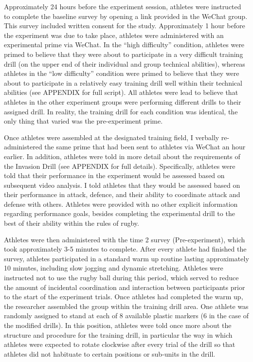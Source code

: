 Approximately 24 hours before the experiment session, athletes were instructed to complete the baseline survey by opening a link provided in the WeChat group.  This survey included written consent for the study. Approximately 1 hour before the experiment was due to take place, athletes were administered with an experimental prime via WeChat.  In the ``high difficulty'' condition, athletes were primed to believe that they were about to participate in a very difficult training drill (on the upper end of their individual and group technical abilities), whereas athletes in the ``low difficulty'' condition were primed to believe that they were about to participate in a relatively easy training drill well within their technical abilities (see APPENDIX for full script). All athletes were lead to believe that athletes in the other experiment groups were performing different drills to their assigned drill. In reality, the training drill for each condition was identical, the only thing that varied was the pre-experiment prime.

Once athletes were assembled at the designated training field, I verbally re-administered the same prime that had been sent to athletes via WeChat an hour earlier.  In addition, athletes were told in more detail about the requirements of the Invasion Drill (see APPENDIX for full details).  Specifically, athletes were told that their performance in the experiment would be assessed based on subsequent video analysis.  I told athletes that they would be assessed based on their performance in attack, defence, and their ability to coordinate attack and defense with others.  Athletes were provided with no other explicit information regarding performance goals, besides completing the experimental drill to the best of their ability within the rules of rugby.

Athletes were then administered with the time 2 survey (Pre-experiment), which took approximately 3-5 minutes to complete.  After every athlete had finished the survey, athletes participated in a standard warm up routine lasting approximately 10 minutes, including slow jogging and dynamic stretching.  Athletes were instructed not to use the rugby ball during this period, which served to reduce the amount of incidental coordination and interaction between participants prior to the start of the experiment trials.  Once athletes had completed the warm up, the researcher assembled the group within the training drill area.  One athlete was randomly assigned to stand at each of 8 available plastic markers (6 in the case of the modified drills).  In this position, athletes were told once more about the structure and procedure for the training drill, in particular the way in which athletes were expected to rotate clockwise after every trial of the drill so that athletes did not habituate to certain positions or sub-units in the drill.

